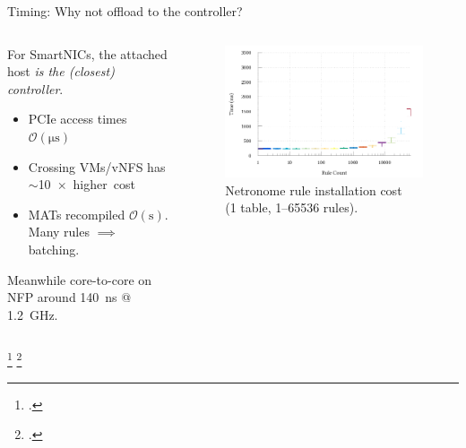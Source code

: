\documentclass[aspectratio=169,xcolor={dvipsnames}
]{beamer}
\begin{document}
\begin{frame}{Timing: Why not offload to the controller?}
	\begin{columns}
		\begin{column}{0.5\linewidth}
			For SmartNICs, the attached host \emph{is the (closest) controller}.
			
			\begin{itemize}
				\item PCIe access times $\mathcal{O}(\si{\micro\second})$\footnotemark
				\item Crossing VMs/vNFS has $\sim$\SI{10}{$\times$} higher cost\footnotemark
				\item MATs recompiled $\mathcal{O}(\si{\second})$. Many rules $\implies$ batching.
			\end{itemize}
			
			
			\alert{Meanwhile core-to-core on NFP around \SI{140}{\nano\second} @ \SI{1.2}{\giga\hertz}.}
		\end{column}
		\begin{column}{0.5\linewidth}
			\begin{figure}
				\includegraphics[width=0.9\linewidth]{../plots/build/rte-timer/rte-times-logx}
				\caption{Netronome rule installation cost \\(1 table, \numrange{1}{65536} rules).}
			\end{figure}
		\end{column}
	\end{columns}
	\setcounter{footnote}{3}
	\footcitetext{DBLP:conf/sigcomm/NeugebauerAZAL018}
	\setcounter{footnote}{4}
	\footcitetext{DBLP:journals/cm/CzivaP17}
\end{frame}
\end{document}
